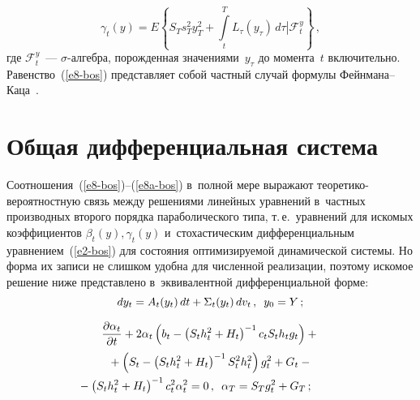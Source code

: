 \begin{multicols}{2}
     \noindent
     \begin{equation}
\gamma_t(y)=\displaystyle
     E\left\{ S_T s_T^2 y_T^2 +\int\limits_t^T L_\tau(y_\tau)\,d\tau\left\vert 
\mathcal{F}_t^y\right.\right\}\,,
     \label{e8a-bos}
     \end{equation}
где $\mathcal{F}_t^y$~--- $\sigma$-ал\-геб\-ра, порожденная 
значениями~$y_\tau$ до момента~$t$ включительно. Равенство~(\ref{e8-bos}) 
пред\-став\-ля\-ет собой частный случай формулы  
Фейн\-ма\-на--Ка\-ца~\cite{5-bos}.

\section{Общая дифференциальная система}
     
     Соотношения~(\ref{e8-bos})--(\ref{e8a-bos})
      в~полной мере выражают тео\-ре\-ти\-ко-ве\-ро\-ят\-ност\-ную 
      связь между решениями линейных уравнений в~частных 
производных второго порядка параболического типа, т.\,е.\ уравнений для 
искомых коэффициентов $\beta_t(y), \gamma_t(y)$ и~стохастическим 
дифференциальным уравнением~(\ref{e2-bos}) для состояния 
оптимизируемой динамической системы. Но форма их записи не слишком 
удобна для численной реализации, поэтому искомое решение ниже 
представлено в~эквивалентной дифференциальной форме:
     \begin{equation}
     dy_t=A_t(y_t)\,dt+\Sigma_t(y_t)\,dv_t\,,\enskip y_0=Y\,;
     \label{e9-bos}
     \end{equation}
     
\vspace*{-12pt}

     \noindent
     \begin{multline}
          \fr{\partial \alpha_t}{\partial t} +2\alpha_t \left( b_t- \left( S_t 
h_t^2+H_t\right)^{-1} c_t S_t h_t g_t\right)+{}\\
{}+
     \left( S_t-\left( S_t h_t^2 +H_t\right)^{-1} S_t^2 h_t^2\right) g_t^2+
     G_t-{}\\
     \hspace*{-10mm}{}- \left( S_t h_t^2+H_t\right)^{-1} c_t^2 \alpha_t^2=0\,,\enskip
     \alpha_T=S_T g_t^2+G_T\,;
     \label{e10-bos}
     \end{multline}
     

\end{multicols}
